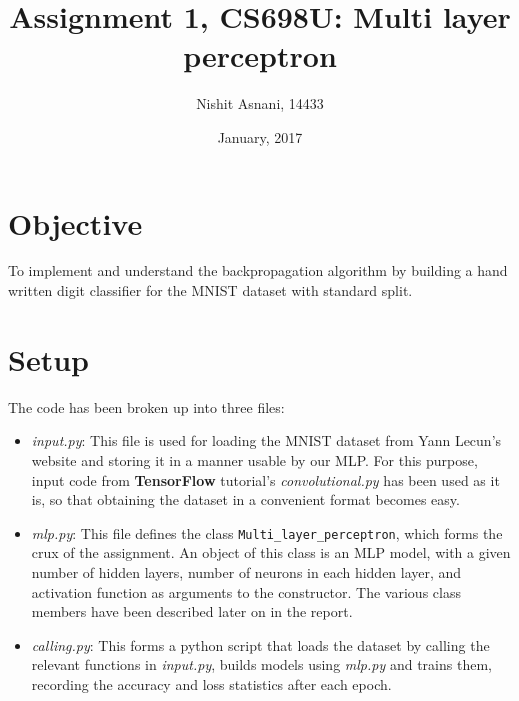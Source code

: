 \documentclass[12pt, a4paper]{article}
\title{\textbf{Assignment 1, CS698U: Multi layer perceptron}}
\author{Nishit Asnani, 14433}
\date{January, 2017}
\begin{document}
\maketitle

\section{Objective}
To implement and understand the backpropagation algorithm by building a hand written digit classifier for the MNIST dataset with standard split.

\section{Setup}
The code has been broken up into three files:

\begin{itemize}
\item \textit{input.py}: This file is used for loading the MNIST dataset from Yann Lecun's website and storing it in a manner usable by our MLP. For this purpose, input code from \textbf{TensorFlow} tutorial's \textit{convolutional.py} \cite{mnist_load} has been used as it is, so that obtaining the dataset in a convenient format becomes easy. 

\item \textit{mlp.py}: This file defines the class \texttt{Multi\_layer\_perceptron}, which forms the crux of the assignment. An object of this class is an MLP model, with a given number of hidden layers, number of neurons in each hidden layer, and activation function as arguments to the constructor. The various class members have been described later on in the report.

\item \textit{calling.py}: This forms a python script that loads the dataset by calling the relevant functions in \textit{input.py}, builds models using \textit{mlp.py} and trains them, recording the accuracy and loss statistics after each epoch. 

\end{itemize}
\end{document}

